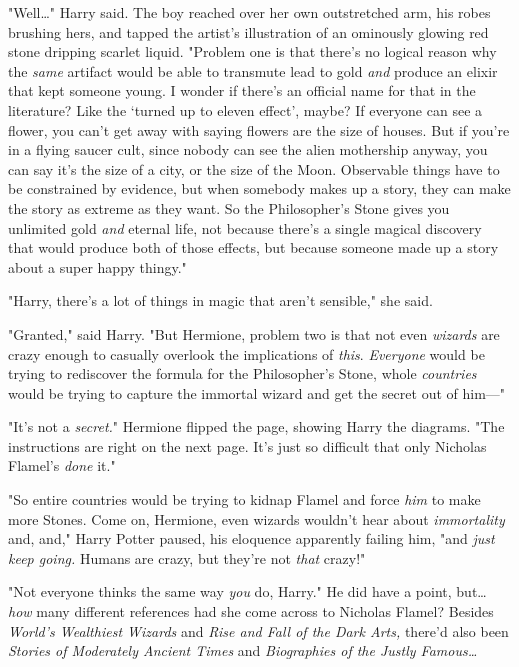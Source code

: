"Well{\ldots}" Harry said. The boy reached over her own outstretched arm, his
robes brushing hers, and tapped the artist's illustration of an ominously
glowing red stone dripping scarlet liquid. "Problem one is that there's no
logical reason why the \emph{same} artifact would be able to transmute lead to
gold \emph{and} produce an elixir that kept someone young. I wonder if there's
an official name for that in the literature? Like the `turned up to eleven
effect', maybe? If everyone can see a flower, you can't get away with saying
flowers are the size of houses. But if you're in a flying saucer cult, since
nobody can see the alien mothership anyway, you can say it's the size of a
city, or the size of the Moon. Observable things have to be constrained by
evidence, but when somebody makes up a story, they can make the story as
extreme as they want. So the Philosopher's Stone gives you unlimited gold
\emph{and} eternal life, not because there's a single magical discovery that
would produce both of those effects, but because someone made up a story about
a super happy thingy."

"Harry, there's a lot of things in magic that aren't sensible," she said.

"Granted," said Harry. "But Hermione, problem two is that not even
\emph{wizards} are crazy enough to casually overlook the implications of
\emph{this}. \emph{Everyone} would be trying to rediscover the formula for the
Philosopher's Stone, whole \emph{countries} would be trying to capture the
immortal wizard and get the secret out of him---"

"It's not a \emph{secret.}" Hermione flipped the page, showing Harry the
diagrams. "The instructions are right on the next page. It's just so difficult
that only Nicholas Flamel's \emph{done} it."

"So entire countries would be trying to kidnap Flamel and force \emph{him} to
make more Stones. Come on, Hermione, even wizards wouldn't hear about
\emph{immortality} and, and," Harry Potter paused, his eloquence apparently
failing him, "and \emph{just keep going.} Humans are crazy, but they're not
\emph{that} crazy!"

"Not everyone thinks the same way \emph{you} do, Harry." He did have a point,
but{\ldots} \emph{how} many different references had she come across to
Nicholas Flamel? Besides \emph{World's Wealthiest Wizards} and \emph{Rise and
Fall of the Dark Arts,} there'd also been \emph{Stories of Moderately Ancient
Times} and \emph{Biographies of the Justly Famous{\ldots}}

